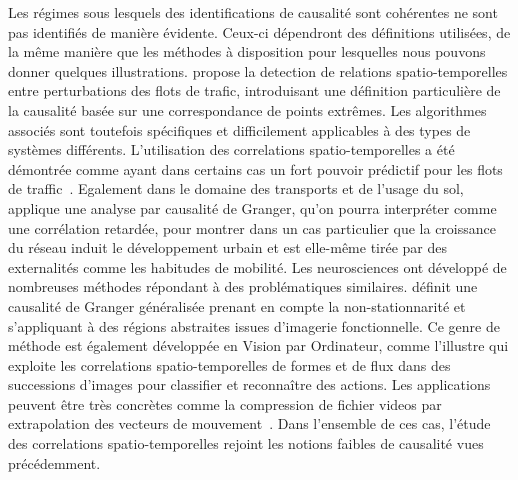 \documentclass[french]{./sageo}
\begin{document}
Les régimes sous lesquels des identifications de causalité sont cohérentes ne sont pas identifiés de manière évidente. Ceux-ci dépendront des définitions utilisées, de la même manière que les méthodes à disposition pour lesquelles nous pouvons donner quelques illustrations. \cite{liu2011discovering} propose la detection de relations spatio-temporelles entre perturbations des flots de trafic, introduisant une définition particulière de la causalité basée sur une correspondance de points extrêmes. Les algorithmes associés sont toutefois spécifiques et difficilement applicables à des types de systèmes différents. L'utilisation des correlations spatio-temporelles a été démontrée comme ayant dans certains cas un fort pouvoir prédictif pour les flots de traffic~\cite{min2011real}. Egalement dans le domaine des transports et de l'usage du sol, \cite{xie2009streetcars} applique une analyse par causalité de Granger, qu'on pourra interpréter comme une corrélation retardée, pour montrer dans un cas particulier que la croissance du réseau induit le développement urbain et est elle-même tirée par des externalités comme les habitudes de mobilité. Les neurosciences ont développé de nombreuses méthodes répondant à des problématiques similaires. \cite{luo2013spatio} définit une causalité de Granger généralisée prenant en compte la non-stationnarité et s'appliquant à des régions abstraites issues d'imagerie fonctionnelle. Ce genre de méthode est également développée en Vision par Ordinateur, comme l'illustre \cite{ke2007spatio} qui exploite les correlations spatio-temporelles de formes et de flux dans des successions d'images pour classifier et reconnaître des actions. Les applications peuvent être très concrètes comme la compression de fichier videos par extrapolation des vecteurs de mouvement~\cite{chalidabhongse1997fast}. Dans l'ensemble de ces cas, l'étude des correlations spatio-temporelles rejoint les notions faibles de causalité vues précédemment.
\end{document}
